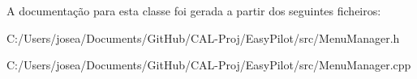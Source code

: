 A documentação para esta classe foi gerada a partir dos seguintes ficheiros\+:\begin{DoxyCompactItemize}
\item 
C\+:/\+Users/josea/\+Documents/\+Git\+Hub/\+C\+A\+L-\/\+Proj/\+Easy\+Pilot/src/Menu\+Manager.\+h\item 
C\+:/\+Users/josea/\+Documents/\+Git\+Hub/\+C\+A\+L-\/\+Proj/\+Easy\+Pilot/src/Menu\+Manager.\+cpp\end{DoxyCompactItemize}
